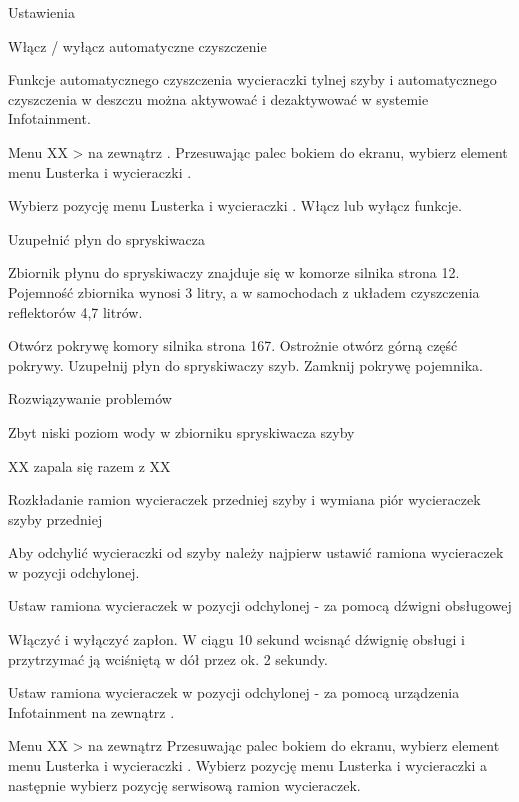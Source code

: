 Ustawienia

Włącz / wyłącz automatyczne czyszczenie

Funkcje automatycznego czyszczenia wycieraczki tylnej szyby i automatycznego czyszczenia w deszczu można aktywować i dezaktywować w systemie Infotainment.
\begin{itemizeArrow}
	\itemArrow Menu XX > na zewnątrz .
	\itemArrow Przesuwając palec bokiem do ekranu, wybierz element menu Lusterka i wycieraczki .
\end{itemizeArrow}

\begin{itemizeArrow}
	\itemArrow Wybierz pozycję menu Lusterka i wycieraczki .
	\itemArrow Włącz lub wyłącz funkcje.
\end{itemizeArrow}

Uzupełnić płyn do spryskiwacza

Zbiornik płynu do spryskiwaczy znajduje się w komorze silnika \guillemotright strona 12.
Pojemność zbiornika wynosi 3 litry, a w samochodach z układem czyszczenia reflektorów 4,7 litrów.


\begin{itemizeArrow}
	\itemArrow Otwórz pokrywę komory silnika \guillemotright strona 167.
	\itemArrow Ostrożnie otwórz górną część pokrywy.
	\itemArrow Uzupełnij płyn do spryskiwaczy szyb.
	\itemArrow Zamknij pokrywę pojemnika.
\end{itemizeArrow}

Rozwiązywanie problemów

Zbyt niski poziom wody w zbiorniku spryskiwacza szyby

XX zapala się razem z XX


Rozkładanie ramion wycieraczek przedniej szyby i wymiana piór wycieraczek szyby przedniej

Aby odchylić wycieraczki od szyby należy najpierw ustawić ramiona wycieraczek w pozycji odchylonej.


Ustaw ramiona wycieraczek w pozycji odchylonej - za pomocą dźwigni obsługowej
\begin{itemizeArrow}
	\itemArrow Włączyć i wyłączyć zapłon.
	\itemArrow W ciągu 10 sekund wcisnąć dźwignię obsługi i przytrzymać ją wciśniętą w dół przez ok. 2 sekundy.
\end{itemizeArrow}
Ustaw ramiona wycieraczek w pozycji odchylonej
- za pomocą urządzenia Infotainment
na zewnątrz .
\begin{itemizeArrow}
	\itemArrow Menu XX > na zewnątrz 
	\itemArrow Przesuwając palec bokiem do ekranu, wybierz element menu Lusterka i wycieraczki .
	\itemArrow Wybierz pozycję menu Lusterka i wycieraczki a następnie wybierz pozycję serwisową ramion wycieraczek.
\end{itemizeArrow}


